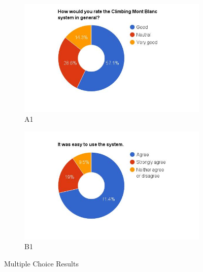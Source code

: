 \begin{figure}
    \begin{subfigure}[h]{0.45\textwidth}
        \centerline{\includegraphics[width=1.5\textwidth]{results/general_cmb.jpg}}
        \caption{A1}
        \label{fig:cmb-general}
    \end{subfigure}
    \hfill
    \begin{subfigure}[h]{0.45\textwidth}
        \centerline{\includegraphics[width=1.5\textwidth]{results/easy_to_use.jpg}}
        \caption{B1}
        \label{fig:cmb-easy-use}
    \end{subfigure}
    \caption[]{Multiple Choice Results}
    \label{fig:multiplechoice}
\end{figure}


